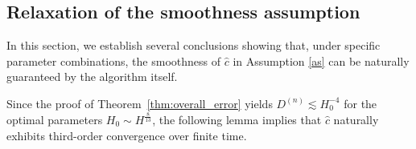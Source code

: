 \documentclass[review,onefignum,onetabnum]{siamart250211}
\begin{document}

\subsection{Relaxation of the smoothness assumption}
\label{subsec:c_hat_relax}
In this section, we establish several conclusions showing that, under specific parameter combinations, the smoothness of $\hat{c}$ in Assumption \ref{as} can be naturally guaranteed by the algorithm itself.

Since the proof of Theorem~\ref{thm:overall_error} yields $D^{(n)}\lesssim H_0^{-4}$ for the optimal parameters \(H_0 \sim H^\frac{8}{13}\), the following lemma implies that $\hat{c}$ naturally exhibits third-order convergence over finite time.
\end{document}
